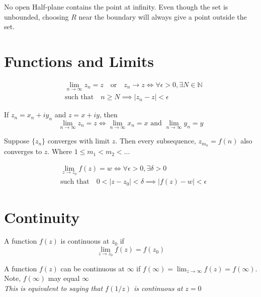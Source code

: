 \begin{example}
    No open Half-plane contains the point at infinity. Even though the set is unbounded, choosing $R$ near the boundary will always give a point outside the set.
\end{example}

\section{Functions and Limits}

\begin{definition}
    \begin{align}
         & \lim_{n \to \infty} z_n = z \quad \text{or}\quad z_n \to z \iff \forall \epsilon > 0, \exists N \in \mathbb{N} \\
         & \text{such that} \quad n \geq N \implies |z_n - z| < \epsilon
    \end{align}
\end{definition}

\begin{corollary}
    If $z_n = x_n + iy_n$ and $z = x + iy$, then
    \[
        \lim_{n \to \infty} z_n = z \iff \lim_{n \to \infty} x_n = x \text{ and } \lim_{n \to \infty} y_n = y
    \]
\end{corollary}

\begin{theorem}
    [Subsequence]
    Suppose $\{z_n\}$ converges with limit $z$. Then every subsequence, $z_{m_n} = f(n)$ also converges to $z$. Where $ 1 \leq m_1 < m_2 < \ldots$
\end{theorem}

\begin{definition}
    \begin{align}
         & \lim_{z \to z_0} f(z) = w \iff \forall \epsilon > 0, \exists \delta > 0     \\
         & \text{such that}\quad 0 < |z - z_0| < \delta \implies |f(z) - w| < \epsilon
    \end{align}
\end{definition}

\section{Continuity}
\begin{definition}
    A function $f(z)$ is continuous at $z_0$ if
    \[
        \lim_{z \to z_0} f(z) = f(z_0)
    \]
\end{definition}

\begin{corollary}
    A function $f(z)$ can be continuous at $\infty$ if $f(\infty) = \lim_{z\to \infty}f(z) = f(\infty)$. Note, $f(\infty)$ may equal $\infty$ \\
    \textit{This is equivalent to saying that $f(1/z)$ is continuous at $z = 0$}
\end{corollary}